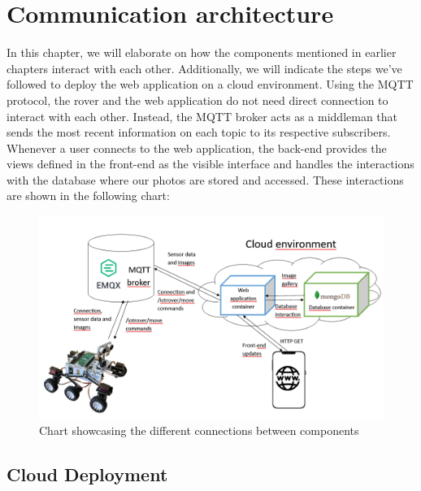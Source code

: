 \chapter{Communication architecture}

In this chapter, we will elaborate on how the components mentioned in earlier chapters interact with each other. Additionally, we will indicate the steps we've followed to deploy the web application on a cloud environment.
Using the MQTT protocol, the rover and the web application do not need direct connection to interact with each other. Instead, the MQTT broker acts as a middleman that sends the most recent information on each topic to its respective subscribers. Whenever a user connects to the web application, the back-end provides the views defined in the front-end as the visible interface and handles the interactions with the database where our photos are stored and accessed. These interactions are shown in the following chart:
\begin{figure}[H]
    \centering
    \includegraphics[width=1\linewidth]{Hauptkapitel/Pictures/connectionchart.png}
    \caption{Chart showcasing the different connections between components}
    \label{fig:enter-label}
\end{figure}
\section{Cloud Deployment}


